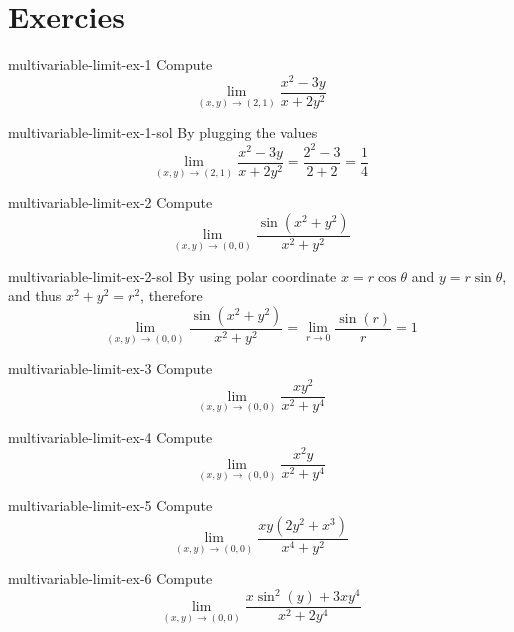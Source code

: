 \documentclass[preview]{standalone}
\begin{document}
\genpage

\section{Exercies}

\begin{snippetexercise}{multivariable-limit-ex-1}{}
    Compute
    \[
        \lim _{(x, y) \rightarrow(2,1)} \frac{x^2-3 y}{x+2 y^2}
    \]
\end{snippetexercise}

\begin{snippetsolution}{multivariable-limit-ex-1-sol}{}
    By plugging the values \[
        \lim _{(x, y) \rightarrow(2,1)} \frac{x^2-3 y}{x+2 y^2}
        = \frac{2^2-3}{2+2} = \frac{1}{4}
    \]
\end{snippetsolution}

\begin{snippetexercise}{multivariable-limit-ex-2}{}
    Compute
    \[
        \lim _{(x, y) \rightarrow(0,0)} \frac{\sin \left(x^2+y^2\right)}{x^2+y^2}
    \]
\end{snippetexercise}

\begin{snippetsolution}{multivariable-limit-ex-2-sol}{}
    By using polar coordinate \(x=r\cos\theta\) and \(y=r\sin\theta\),
    and thus \(x^2+y^2=r^2\), therefore
    \[
        \lim_{(x, y) \rightarrow(0,0)} \frac{\sin \left(x^2+y^2\right)}{x^2+y^2}
        = \lim_{r \rightarrow 0} \frac{\sin \left(r\right)}{r}=1
    \]
\end{snippetsolution}

\begin{snippetexercise}{multivariable-limit-ex-3}{}
    Compute
    \[
        \lim_{(x, y) \rightarrow(0,0)} \frac{x y^2}{x^2+y^4}
    \]
\end{snippetexercise}

\begin{snippetexercise}{multivariable-limit-ex-4}{}
    Compute
    \[
        \lim_{(x, y) \rightarrow(0,0)} \frac{x^2 y}{x^2+y^4}
    \]
\end{snippetexercise}

\begin{snippetexercise}{multivariable-limit-ex-5}{}
    Compute
    \[
        \lim_{(x, y) \rightarrow(0,0)} \frac{xy(2y^2 + x^3)}{x^4 + y^2}
    \]
\end{snippetexercise}

\begin{snippetexercise}{multivariable-limit-ex-6}{}
    Compute
    \[
        \lim_{(x, y) \rightarrow(0,0)} \frac{x\sin^2(y) + 3xy^4}{x^2 + 2y^4}
    \]
\end{snippetexercise}
\end{document}
